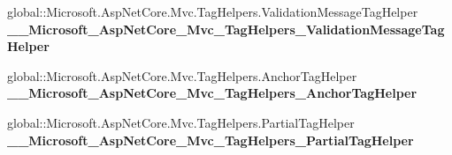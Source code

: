 \begin{DoxyCompactItemize}
global\+::\+Microsoft.\+Asp\+Net\+Core.\+Mvc.\+Tag\+Helpers.\+Validation\+Message\+Tag\+Helper {\bfseries \+\_\+\+\_\+\+Microsoft\+\_\+\+Asp\+Net\+Core\+\_\+\+Mvc\+\_\+\+Tag\+Helpers\+\_\+\+Validation\+Message\+Tag\+Helper}
\item 
\mbox{\label{class_projeto_e_s_w_1_1_areas_1_1_identity_1_1_pages_1_1_account_1_1_areas___identity___pages___account___login_a5a0d8928a74b534f04644205ed0ead93}} 
global\+::\+Microsoft.\+Asp\+Net\+Core.\+Mvc.\+Tag\+Helpers.\+Anchor\+Tag\+Helper {\bfseries \+\_\+\+\_\+\+Microsoft\+\_\+\+Asp\+Net\+Core\+\_\+\+Mvc\+\_\+\+Tag\+Helpers\+\_\+\+Anchor\+Tag\+Helper}
\item 
\mbox{\label{class_projeto_e_s_w_1_1_areas_1_1_identity_1_1_pages_1_1_account_1_1_areas___identity___pages___account___login_a49deeb436a8b7c32e47d44ea55cd7c7c}} 
global\+::\+Microsoft.\+Asp\+Net\+Core.\+Mvc.\+Tag\+Helpers.\+Partial\+Tag\+Helper {\bfseries \+\_\+\+\_\+\+Microsoft\+\_\+\+Asp\+Net\+Core\+\_\+\+Mvc\+\_\+\+Tag\+Helpers\+\_\+\+Partial\+Tag\+Helper}
\end{DoxyCompactItemize}
